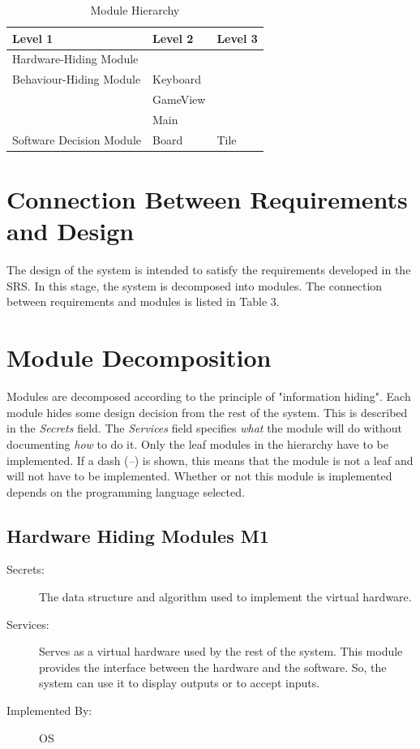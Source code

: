 \documentclass[12pt]{article}
\begin{document}
\begin{table}[!htbp]
	\centering
	\begin{tabular}{p{5cm}|p{4cm}|p{4cm}}
		\textbf{Level 1} & \textbf{Level 2} & \textbf{Level 3} \\\hline
		Hardware-Hiding Module & \\\hline
		Behaviour-Hiding Module & Keyboard & \\
		& GameView & \\
		& Main & \\\hline
		Software Decision Module & Board & Tile\\\hline
		
	\end{tabular}
	\smallskip
	\caption{Module Hierarchy}
	\label{Module Hierarchy}	
\end{table}

\section{Connection Between Requirements and Design}
The design of the system is intended to satisfy the requirements developed in the SRS. In this stage, the system is decomposed into modules. The connection between requirements and modules is listed in Table 3.

\section{Module Decomposition}
Modules are decomposed according to the principle of "information hiding". Each module hides some design decision from the rest of the system. This is described in the \textit{Secrets} field. The \textit{Services} field specifies \textit{what} the module will do without documenting \textit{how} to do it. Only the leaf modules in the hierarchy have to be implemented. If a dash (\emph{--}) is shown, this means that the module is not a leaf and will not have to be implemented. Whether or not this module is implemented depends on the programming language selected.

\subsection{Hardware Hiding Modules \textbf{M1}}

\begin{description}
\item[Secrets:]The data structure and algorithm used to implement the virtual
  hardware.
\item[Services:]Serves as a virtual hardware used by the rest of the
  system. This module provides the interface between the hardware and the
  software. So, the system can use it to display outputs or to accept inputs.
\item[Implemented By:] OS
\end{description}
\end{document}
